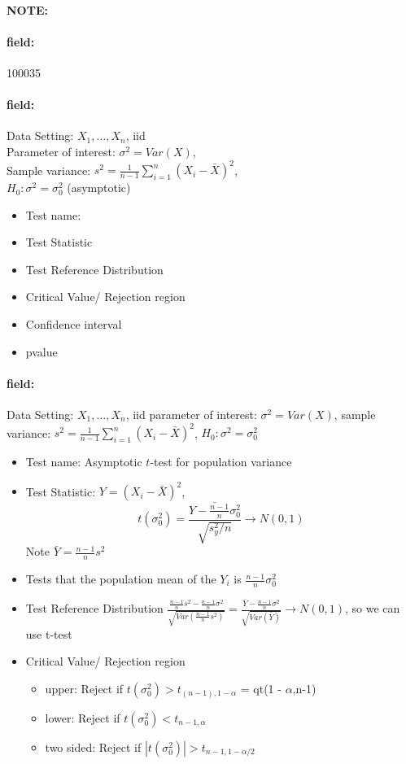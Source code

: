 \documentclass[12pt]{article}
\newenvironment{note}{\paragraph{NOTE:}}{}
\newenvironment{field}{\paragraph{field:}}{}
\begin{document}
\begin{note} \begin{field} \tiny 100035 \end{field}
 \begin{field}
  Data Setting: $X_1, \ldots, X_n$, iid \\
  Parameter of interest: $\sigma^2 = Var(X)$,\\
  Sample variance: $s^2 = \frac{1}{n-1} \sum_{i=1}^n(X_i - \bar{X})^2$, \\
  $H_0: \sigma^2 = \sigma_0^2$ (asymptotic)
  \begin{itemize}
   \item Test name:
   \item Test Statistic
   \item Test Reference Distribution
   \item Critical Value/ Rejection region
   \item Confidence interval
   \item pvalue
  \end{itemize}
 \end{field}
 \begin{field}
  Data Setting: $X_1, \ldots, X_n$, iid parameter of interest: $\sigma^2 = Var(X)$, sample variance: $s^2 = \frac{1}{n-1} \sum_{i=1}^n(X_i - \bar{X})^2$, $H_0: \sigma^2 = \sigma_0^2$
  \begin{itemize}
   \item Test name: Asymptotic $t$-test for population variance
   \item Test Statistic: $Y = (X_i - \bar{X})^2$, $$ t(\sigma_0^2)  = \frac{\bar{Y - \frac{n-1}{n}\sigma_0^2}}{\sqrt{s_y^2/n}} \to N(0,1)$$
   Note $\bar{Y} = \frac{n-1}{n}s^2$
   \item Tests that the population mean of the $Y_i$ is $\frac{n-1}{n}\sigma_0^2$
   \item Test Reference Distribution $ \frac{\frac{n-1}{n}s^2 - \frac{n-1}{n}\sigma^2}{\sqrt{Var(\frac{n-1}{n}s^2)}} = \frac{\bar{Y}- \frac{n-1}{n}\sigma^2}{\sqrt{Var(\bar{Y})}} \to N(0,1)$, so we can use t-test
   \item Critical Value/ Rejection region
         \begin{itemize}
          \item upper: Reject if $t(\sigma_0^2) > t_{(n-1),1-\alpha}$ = qt(1 - $\alpha$,n-1)
          \item lower: Reject if $t(\sigma_0^2)  < t_{n-1,\alpha}$
          \item two sided: Reject if $|t(\sigma_0^2)| > t_{n-1, 1 - \alpha/2}$

\end{itemize}
\end{itemize}
\end{field}
\end{note}
\end{document}
